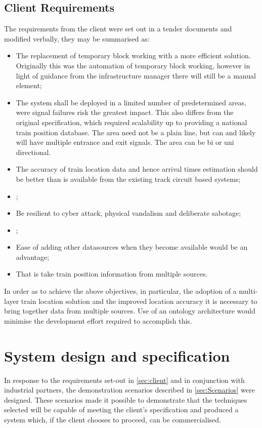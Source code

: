 \subsection{Client Requirements}
\label{sec:client}
The requirements from the client were set out in a tender documents \citep{NetworkRailInfrastructureLtd2015} and modified verbally, they may be summarised as:
\begin{itemize}
    \item The replacement of temporary block working with a more efficient solution. Originally this was the automation of temporary block working, however in light of guidance from the infrastructure manager there will still be a manual element;
    \item The system shall be deployed in a limited number of predetermined areas, were signal failures risk the greatest impact. This also differs from the original specification, which required scalability up to providing a national train position database. The area need not be a plain line, but can and likely will have multiple entrance and exit signals. The area can be bi or uni directional.
    \item The accuracy of train location data and hence arrival times estimation should be better than is available from the existing track circuit based systems;
    \item {};
    \item Be resilient to cyber attack, physical vandalism and deliberate sabotage;
    \item {} ;
    \item Ease of adding other datasources when they become available would be an advantage;
    \item {} That is take train position information from multiple sources. 
\end{itemize}

In order as to achieve the above objectives, in particular, the adoption of a multi-layer train location solution and the improved location accuracy it is necessary to bring together data from multiple sources. Use of an ontology architecture would minimise the development effort required to accomplish this.

\section{System design and specification}
In response to the requirements set-out in \autoref{sec:client} and in conjunction with industrial partners, the demonstration scenarios described in \autoref{sec:Scenarios} were designed. These scenarios made it possible to demonstrate that the techniques selected will be capable of meeting the client's specification and produced a system which, if the client chooses to proceed, can be commercialised. 

